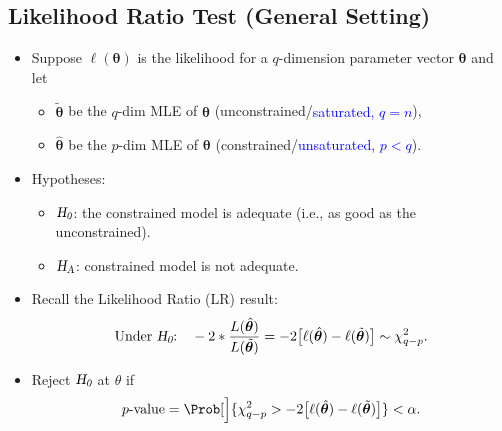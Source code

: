 \documentclass[oneside]{book}\usepackage[]{graphicx}\usepackage[svgnames]{xcolor}
\let\log\relax%
\newcommand{\HN}{\textsl{H}_{\textsl{0}}}%
\newcommand{\HA}{\textsl{H}_{\textsl{A}}}%
\providecommand{\Vector}[1]{\bm{#1}}%
\begin{document}
\subsection*{Likelihood Ratio Test (General Setting)}
\begin{itemize}
      \item Suppose $ \ell(\Vector{\theta}) $ is the likelihood for a $ q $-dimension parameter vector $ \Vector{\theta} $ and let
            \begin{itemize}
                  \item $ \tilde{\Vector{\theta}} $ be the $ q $-dim MLE of $ \Vector{\theta} $ (unconstrained/\textcolor{Blue}{saturated, $ q=n $}),
                  \item $ \hat{\Vector{\theta}} $ be the $ p $-dim MLE of $ \Vector{\theta} $ (constrained/\textcolor{Blue}{unsaturated, $ p<q $}).
            \end{itemize}
      \item Hypotheses:
            \begin{itemize}
                  \item $ \HN $: the constrained model is adequate (i.e., as good as the unconstrained).
                  \item $ \HA $: constrained model is not adequate.
            \end{itemize}
      \item Recall the Likelihood Ratio (LR) result:
            \[ \text{Under $ \HN $:}\quad -2\log*{\frac{L(\hat{\Vector{\theta}})}{L(\tilde{\Vector{\theta}})}}
                  =-2\bigl[\ell(\hat{\Vector{\theta}})-\ell(\tilde{\Vector{\theta}})\bigr]\sim \chi^2_{q-p}. \]
      \item Reject $ \HN $ at $ \theta $ if
            \[ p\text{-value}=\Prob[\Big]{\chi^2_{q-p}>-2\bigl[\ell(\hat{\Vector{\theta}})-\ell(\tilde{\Vector{\theta}})\bigr]}<\alpha. \]
\end{itemize}
\end{document}
